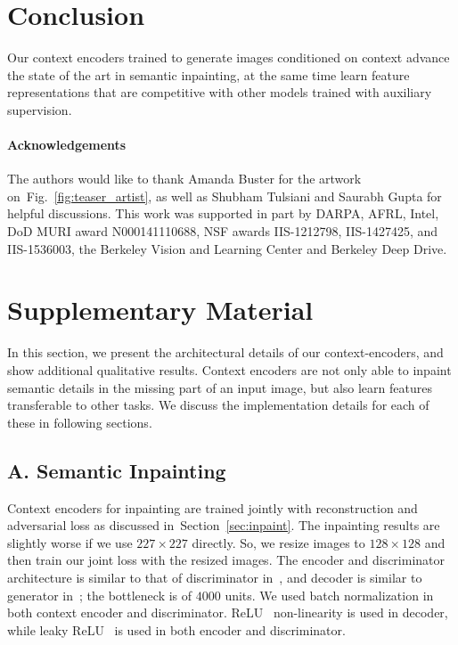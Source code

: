 \documentclass[10pt,twocolumn,letterpaper]{article}
\newcommand{\shortreffig}[1]{Fig.~\ref{fig:#1}}
\newcommand{\refsec}[1]{Section~\ref{sec:#1}}
\begin{document}
\section{Conclusion}
Our context encoders trained to generate images conditioned on context advance the state of the art in semantic inpainting,
at the same time learn feature representations that are competitive with other models trained with auxiliary supervision.

\paragraph{Acknowledgements}
The authors would like to thank Amanda Buster for the artwork on~\shortreffig{teaser_artist}, as well as Shubham Tulsiani and Saurabh Gupta for helpful discussions. This work was supported in part by DARPA, AFRL, Intel, DoD MURI award N000141110688, NSF awards  IIS-1212798, IIS-1427425, and IIS-1536003, the Berkeley Vision and Learning Center and Berkeley Deep Drive.

{\small


}

\section*{Supplementary Material}
In this section, we present the architectural details of our context-encoders, and show additional qualitative results.
Context encoders are not only able to inpaint semantic details in the missing part of an input image, but also learn features transferable to other tasks.
We discuss the implementation details for each of these in following sections.

\subsection*{A. Semantic Inpainting}
Context encoders for inpainting are trained jointly with reconstruction and adversarial loss as discussed in~\refsec{inpaint}.
The inpainting results are slightly worse if we use $227\times 227$ directly.
So, we resize images to $128\times 128$ and then train our joint loss with the resized images.
The encoder and discriminator architecture is similar to that of discriminator in~\cite{dcgan}, and decoder is similar to generator in~\cite{dcgan}; the bottleneck is of $4000$ units.
We used batch normalization in both context encoder and discriminator.
ReLU~\cite{krizhevsky2012imagenet} non-linearity is used in decoder, while leaky ReLU~\cite{dcgan} is used in both encoder and discriminator.
\end{document}

